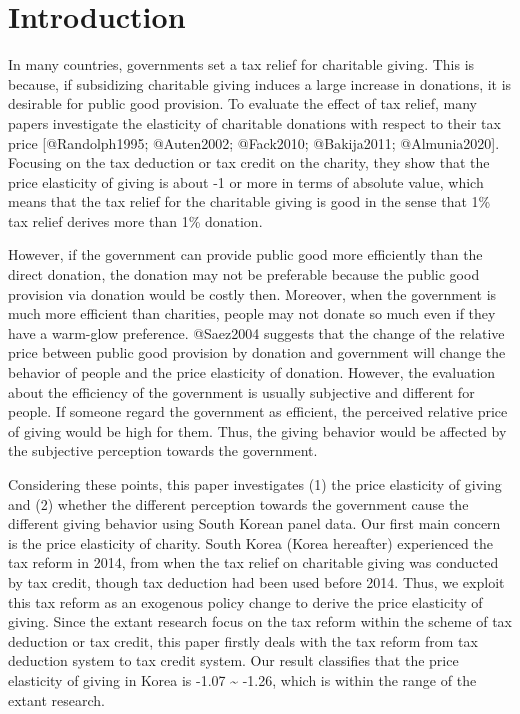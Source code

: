 \documentclass[
]{article}
\author{}
\date{\vspace{-2.5em}}
\begin{document}
{
\setcounter{tocdepth}{2}
\tableofcontents
}
\hypertarget{introduction}{%
\section{Introduction}\label{introduction}}

In many countries, governments set a tax relief for charitable giving. This is because, if subsidizing charitable giving induces a large increase in donations, it is desirable for public good provision. To evaluate the effect of tax relief, many papers investigate the elasticity of charitable donations with respect to their tax price {[}@Randolph1995; @Auten2002; @Fack2010; @Bakija2011; @Almunia2020{]}. Focusing on the tax deduction or tax credit on the charity, they show that the price elasticity of giving is about -1 or more in terms of absolute value, which means that the tax relief for the charitable giving is good in the sense that 1\% tax relief derives more than 1\% donation.

However, if the government can provide public good more efficiently than the direct donation, the donation may not be preferable because the public good provision via donation would be costly then.
Moreover, when the government is much more efficient than charities, people may not donate so much even if they have a warm-glow preference. @Saez2004 suggests that the change of the relative price between public good provision by donation and government will change the behavior of people and the price elasticity of donation.
However, the evaluation about the efficiency of the government is usually subjective and different for people. If someone regard the government as efficient, the perceived relative price of giving would be high for them. Thus, the giving behavior would be affected by the subjective perception towards the government.

Considering these points, this paper investigates (1) the price elasticity of giving and (2) whether the different perception towards the government cause the different giving behavior using South Korean panel data.
Our first main concern is the price elasticity of charity. South Korea (Korea hereafter) experienced the tax reform in 2014, from when the tax relief on charitable giving was conducted by tax credit, though tax deduction had been used before 2014. Thus, we exploit this tax reform as an exogenous policy change to derive the price elasticity of giving. Since the extant research focus on the tax reform within the scheme of tax deduction or tax credit, this paper firstly deals with the tax reform from tax deduction system to tax credit system.
Our result classifies that the price elasticity of giving in Korea is -1.07 \textasciitilde{} -1.26, which is within the range of the extant research.
\end{document}
